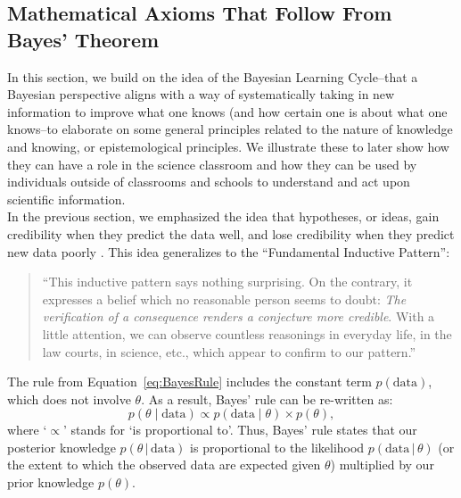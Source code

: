 \documentclass[man, floatsintext]{apa7} %
\newcommand{\given}{\, | \,}
\begin{document}
\subsection{Mathematical Axioms That Follow From Bayes' Theorem}

In this section, we build on the idea of the Bayesian Learning Cycle--that a Bayesian perspective aligns with a way of systematically taking in new information to improve what one knows (and how certain one is about what one knows--to elaborate on some general principles related to the nature of knowledge and knowing, or epistemological principles. We illustrate these to later show how they can have a role in the science classroom and how they can be used by individuals outside of classrooms and schools to understand and act upon scientific information. \\

In the previous section, we emphasized the idea that hypotheses, or ideas, gain credibility when they predict the data well, and lose credibility when they predict new data poorly \parencite{WagenmakersEtAl2016CD}. This idea generalizes to the ``Fundamental Inductive Pattern'':
\begin{quotation}

\noindent ``This inductive pattern says nothing surprising. On the contrary, it expresses a belief which no reasonable person seems to doubt: \emph{The verification of a consequence renders a conjecture more credible}. With a little attention, we can observe countless reasonings in everyday life, in the law courts, in science, etc., which appear to confirm to our pattern.'' \parencite[pp. 4-5]{Polya1954Vol2}
\end{quotation}

The rule from Equation~\ref{eq:BayesRule} includes the constant term $p(\text{data})$, which does not involve $\theta$. As a result, Bayes' rule can be re-written as:
\begin{equation}
\label{eq:BayesRulePropto}
p(\theta \mid \text{data}) \propto p(\text{data} \mid \theta) \times p(\theta),
\end{equation}
where `$\propto$' stands for `is proportional to'. Thus, Bayes' rule states that our posterior knowledge $p(\theta \given \text{data})$ is proportional to the likelihood $p(\text{data} \given \theta)$ (or the extent to which the observed data are expected given $\theta$) multiplied by our prior knowledge $p(\theta)$. \\
\end{document}
